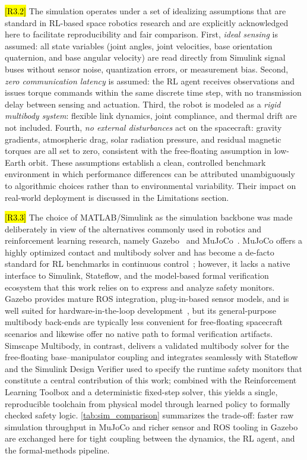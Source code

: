 \documentclass{ieeeaccess}
\newcommand{\hlthree}[1]{{\sethlcolor{rthree}\hl{#1}}}
\newenvironment{rthreehl}
  {\def\FrameCommand{\colorbox{rthree}}\MakeFramed{\advance\hsize-\width\FrameRestore}}
  {\endMakeFramed}
\begin{document}
\begin{rthreehl}
\hlthree{[R3.2]} The simulation operates under a set of idealizing assumptions that are standard in RL-based space robotics research and are explicitly acknowledged here to facilitate reproducibility and fair comparison. First, \emph{ideal sensing} is assumed: all state variables (joint angles, joint velocities, base orientation quaternion, and base angular velocity) are read directly from Simulink signal buses without sensor noise, quantization errors, or measurement bias. Second, \emph{zero communication latency} is assumed: the RL agent receives observations and issues torque commands within the same discrete time step, with no transmission delay between sensing and actuation. Third, the robot is modeled as a \emph{rigid multibody system}: flexible link dynamics, joint compliance, and thermal drift are not included. Fourth, \emph{no external disturbances} act on the spacecraft: gravity gradients, atmospheric drag, solar radiation pressure, and residual magnetic torques are all set to zero, consistent with the free-floating assumption in low-Earth orbit. These assumptions establish a clean, controlled benchmark environment in which performance differences can be attributed unambiguously to algorithmic choices rather than to environmental variability. Their impact on real-world deployment is discussed in the Limitations section.
\end{rthreehl}

\begin{rthreehl}
\hlthree{[R3.3]} The choice of MATLAB/Simulink as the simulation backbone was made deliberately in view of the alternatives commonly used in robotics and reinforcement learning research, namely Gazebo~\cite{koenig2004gazebo} and MuJoCo~\cite{todorov2012mujoco}. MuJoCo offers a highly optimized contact and multibody solver and has become a de-facto standard for RL benchmarks in continuous control~\cite{korber2021comparing}; however, it lacks a native interface to Simulink, Stateflow, and the model-based formal verification ecosystem that this work relies on to express and analyze safety monitors. Gazebo provides mature ROS integration, plug-in-based sensor models, and is well suited for hardware-in-the-loop development~\cite{collins2021review}, but its general-purpose multibody back-ends are typically less convenient for free-floating spacecraft scenarios and likewise offer no native path to formal verification artifacts. Simscape Multibody, in contrast, delivers a validated multibody solver for the free-floating base--manipulator coupling and integrates seamlessly with Stateflow and the Simulink Design Verifier used to specify the runtime safety monitors that constitute a central contribution of this work; combined with the Reinforcement Learning Toolbox and a deterministic fixed-step solver, this yields a single, reproducible toolchain from physical model through learned policy to formally checked safety logic. \autoref{tab:sim_comparison} summarizes the trade-off: faster raw simulation throughput in MuJoCo and richer sensor and ROS tooling in Gazebo are exchanged here for tight coupling between the dynamics, the RL agent, and the formal-methods pipeline.
\end{rthreehl}
\end{document}
